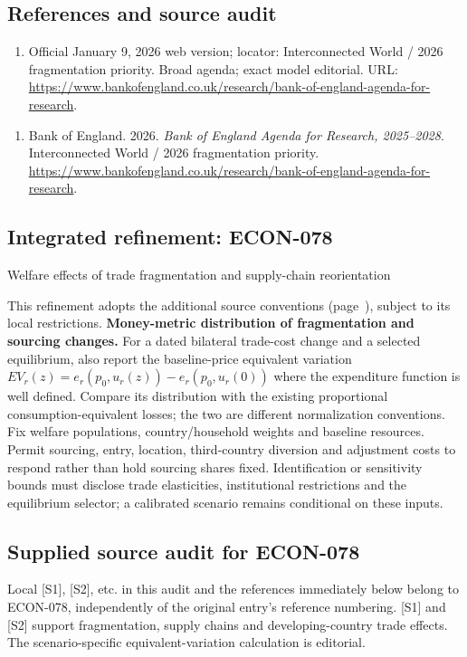 \documentclass[11pt,a4paper]{article}
\begin{document}
\subsection*{References and source audit}
\begin{enumerate}
\item Official January 9, 2026 web version; locator: Interconnected World / 2026 fragmentation priority. Broad agenda; exact model editorial. URL: \url{https://www.bankofengland.co.uk/research/bank-of-england-agenda-for-research}.
\end{enumerate}
\begin{enumerate}\raggedright
\item\hypertarget{definitions:source:30007626:1}{} Bank of England. 2026. \emph{Bank of England Agenda for Research, 2025–2028}. Interconnected World / 2026 fragmentation priority.
\url{https://www.bankofengland.co.uk/research/bank-of-england-agenda-for-research}.
\end{enumerate}

\subsection*{Integrated refinement: ECON-078}
{\sffamily\small\color{muted}Welfare effects of trade fragmentation and supply-chain reorientation\par}
This refinement adopts the additional source conventions
(page~\pageref{audited:conventions}), subject to its local restrictions.
\textbf{Money-metric distribution of fragmentation and sourcing changes.}
For a dated bilateral trade-cost change and a selected equilibrium, also report
the baseline-price equivalent variation
$EV_r(z)=e_r(p_0,u_r(z))-e_r(p_0,u_r(0))$ where the expenditure function is
well defined. Compare its distribution with the existing proportional
consumption-equivalent losses; the two are different normalization conventions.
Fix welfare populations, country/household weights and baseline resources.
Permit sourcing, entry, location, third-country diversion and adjustment costs
to respond rather than hold sourcing shares fixed. Identification or sensitivity
bounds must disclose trade elasticities, institutional restrictions and the
equilibrium selector; a calibrated scenario remains conditional on these inputs.
\subsection*{Supplied source audit for ECON-078}
Local [S1], [S2], etc. in this audit and the references immediately below
belong to ECON-078, independently of the original entry's reference numbering.
[S1] and [S2] support fragmentation, supply chains and developing-country trade effects. The scenario-specific equivalent-variation calculation is editorial.
\end{document}
